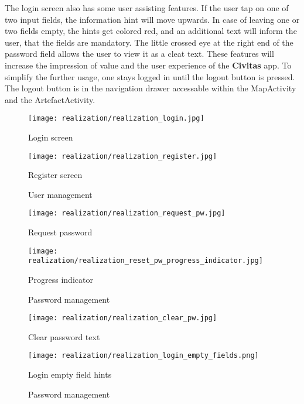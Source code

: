 The login screen also has some user assisting features. If the user tap on one of two input fields, the information hint will move upwards. In case of leaving one or two fields empty, the hints get colored red, and an additional text will inform the user, that the fields are mandatory. The little crossed eye at the right end of the password field allows the user to view it as a cleat text. These features will increase the impression of value and the user experience of the \textbf{Civitas} app. 
To simplify the further usage, one stays logged in until the logout button is pressed. The logout button is in the navigation drawer accessable within the MapActivity and the ArtefactActivity.

\begin{figure}[!htb]
  \texttt{[image: realization/realization\_login.jpg]}
  \caption{Login screen}
  \label{fig:login_screen}
\endminipage\hfill
{}
  \texttt{[image: realization/realization\_register.jpg]}
  \caption{Register screen}
  \label{fig:register_screen}
\endminipage\hfill
\caption{User management}
\label{fig:user_management}
\end{figure}

\begin{figure}[!htb]
  \texttt{[image: realization/realization\_request\_pw.jpg]}
  \caption{Request password}
  \label{fig:pw_request}
\endminipage\hfill
{}
  \texttt{[image: realization/realization\_reset\_pw\_progress\_indicator.jpg]}
  \caption{Progress indicator}
  \label{fig:pw_request_progress}
\endminipage\hfill
\caption{Password management}
\label{fig:pw_management}
\end{figure}

\begin{figure}[!htb]
  \texttt{[image: realization/realization\_clear\_pw.jpg]}
  \caption{Clear password text}
  \label{fig:clear_pw}
\endminipage\hfill
{}
  \texttt{[image: realization/realization\_login\_empty\_fields.png]}
  \caption{Login empty field hints}
  \label{fig:login_empty_fields}
\endminipage\hfill
\caption{Password management}
\label{fig:hint_management}
\end{figure}




